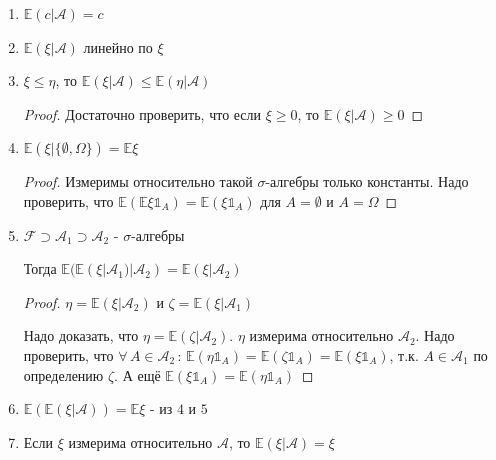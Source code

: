 \begin{properties}
    \begin{enumerate}
        \item $\mathbb{E} (c | \mathcal{A}) = c$
        \item $\mathbb{E} (\xi | \mathcal{A})$ линейно по $\xi$
        \item {$\xi \leqslant \eta$, то $\mathbb{E} (\xi | \mathcal{A}) \leqslant \mathbb{E} (\eta | \mathcal{A})$
            \begin{proof}
                Достаточно проверить, что если $\xi \geqslant 0$, то $\mathbb{E} (\xi | \mathcal{A}) \geqslant 0$
            \end{proof}
        }
        \item {
            $\mathbb{E} (\xi | \{ \emptyset, \Omega \}) = \mathbb{E} \xi$

            \begin{proof}
                Измеримы относительно такой $\sigma$-алгебры только константы. Надо проверить, что $\mathbb{E} (\mathbb{E} \xi \mathds{1}_A) = \mathbb{E} (\xi \mathds{1}_A)$ для $A = \emptyset$ и $A = \Omega$
            \end{proof}
        }
        \item {
            $\mathcal{F} \supset \mathcal{A}_1 \supset \mathcal{A}_2$ - $\sigma$-алгебры

            Тогда $\mathbb{E} (\mathbb{E} (\xi | \mathcal{A}_1) | \mathcal{A}_2) = \mathbb{E} (\xi | \mathcal{A}_2)$

            \begin{proof}
                $\eta = \mathbb{E} (\xi | \mathcal{A}_2)$ и $\zeta = \mathbb{E} (\xi | \mathcal{A}_1)$

                Надо доказать, что $\eta = \mathbb{E} (\zeta | \mathcal{A}_2)$. $\eta$ измерима относительно $\mathcal{A_2}$. Надо проверить, что 
                $\forall \, A \in \mathcal{A}_2 \, : \, \mathbb{E} (\eta \mathds{1}_A) = \mathbb{E} (\zeta \mathds{1}_A) = \mathbb{E} (\xi \mathds{1}_A)$, т.к. $A \in \mathcal{A}_1$ по определению $\zeta$. А ещё
                $\mathbb{E} (\xi \mathds{1}_A) = \mathbb{E} (\eta \mathds{1}_A)$
            \end{proof}
        }
        \item {
            $\mathbb{E} (\mathbb{E} (\xi | \mathcal{A})) = \mathbb{E} \xi$ - из $4$ и $5$
        }
        \item {
            Если $\xi$ измерима относительно $\mathcal{A}$, то $\mathbb{E} (\xi | \mathcal{A}) = \xi$
        }
    \end{enumerate}
\end{properties}

